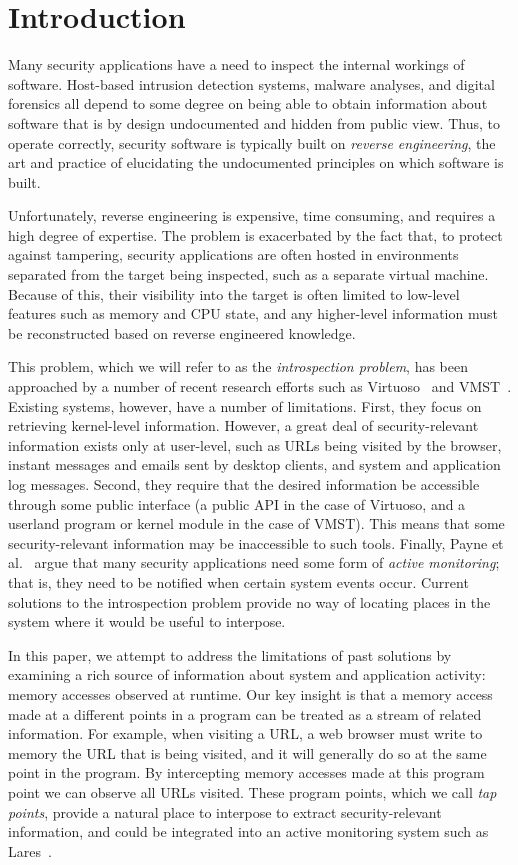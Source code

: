 \section{Introduction}
\label{sec:introduction}

Many security applications have a need to inspect the internal workings
of software. Host-based intrusion detection systems, malware analyses, and
digital forensics all depend to some degree on being able to obtain
information about software that is by design undocumented and hidden
from public view. Thus, to operate correctly, security software is
typically built on \emph{reverse engineering}, the art and practice of
elucidating the undocumented principles on which software is built.

Unfortunately, reverse engineering is expensive, time consuming, and
requires a high degree of expertise. The problem is exacerbated by the
fact that, to protect against tampering, security applications are often
hosted in environments separated from the target being inspected, such
as a separate virtual machine. Because of this, their visibility into
the target is often limited to low-level features such as memory and CPU
state, and any higher-level information must be reconstructed based on
reverse engineered knowledge.

This problem, which we will refer to as the \emph{introspection
problem}, has been approached by a number of recent research efforts
such as Virtuoso~\cite{Dolan-Gavitt:2011uq} and VMST~\cite{Fu:2012fk}.
Existing systems, however, have a number of limitations. First, they
focus on retrieving kernel-level information. However, a great deal of
security-relevant information exists only at user-level, such as URLs
being visited by the browser, instant messages and emails sent by
desktop clients, and system and application log messages. Second,
they require that the desired information be accessible through some
public interface (a public API in the case of Virtuoso, and a userland
program or kernel module in the case of VMST). This means that some
security-relevant information may be inaccessible to such tools.
Finally, Payne et al.~\cite{payne:2008} argue that many security
applications need some form of \emph{active monitoring}; that is, they
need to be notified when certain system events occur. Current solutions
to the introspection problem provide no way of locating places in the
system where it would be useful to interpose.

In this paper, we attempt to address the limitations of past solutions
by examining a rich source of information about system and application
activity: memory accesses observed at runtime. Our key insight is that a
memory access made at a different points in a program can be treated as
a stream of related information. For example, when visiting a URL, a web
browser must write to memory the URL that is being visited, and it will
generally do so at the same point in the program. By intercepting memory
accesses made at this program point we can observe all URLs visited. These
program points, which we call \emph{tap points}, provide a natural place
to interpose to extract security-relevant information, and could be
integrated into an active monitoring system such as
Lares~\cite{payne:2008}.

